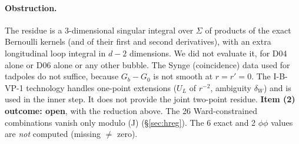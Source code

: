 \paragraph{Obstruction.} The residue is a 3-dimensional singular integral over $\Sigma$ of products of the exact Bernoulli kernels (and of their first and second derivatives), with an extra longitudinal loop integral in $d-2$ dimensions. We did not evaluate it, for D04 alone or D06 alone or any other bubble. The Synge (coincidence) data used for tadpoles do not suffice, because $G_{b}-G_0$ is not smooth at $r=r'=0$. The I-B-VP-1 technology handles one-point extensions ($U_L$ of $r^{-2}$, ambiguity $\delta_W$) and is used in the inner step. It does not provide the joint two-point residue.
\textbf{Item (2) outcome: open}, with the reduction above. The 26 Ward-constrained combinations vanish only modulo (J) (\S\ref{sec:hreg}). The 6 exact and 2 $\phi\phi$ values are \emph{not} computed (missing $\ne$ zero).
